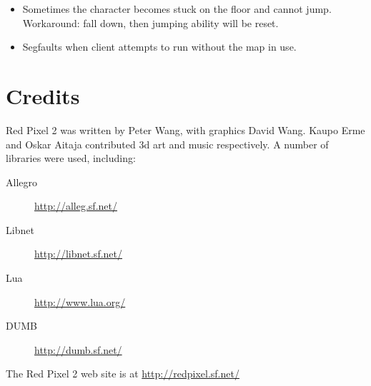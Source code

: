 \documentclass[a4paper]{article}
\begin{document}
\begin{itemize}

\item Sometimes the character becomes stuck on the floor and cannot
  jump.  Workaround: fall down, then jumping ability will be reset.

\item Segfaults when client attempts to run without the map in use.

\end{itemize}



\section{Credits}

Red Pixel 2 was written by Peter Wang, with graphics David Wang.
Kaupo Erme and Oskar Aitaja contributed 3d art and music respectively.
A number of libraries were used, including:

\begin{description}
\item [Allegro] \url{http://alleg.sf.net/}
\item [Libnet] \url{http://libnet.sf.net/}
\item [Lua] \url{http://www.lua.org/}
\item [DUMB] \url{http://dumb.sf.net/}
\end{description}

\noindent
The Red Pixel 2 web site is at \url{http://redpixel.sf.net/}
\end{document}

